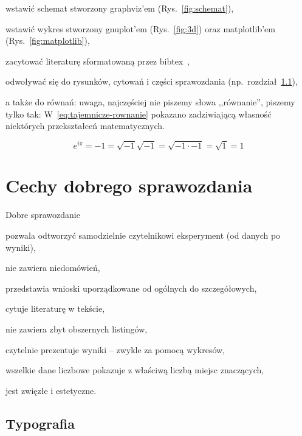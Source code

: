 \documentclass{article}
\begin{document}
\begin{tightlist}
\item wstawić schemat stworzony graphviz'em (Rys.~\ref{fig:schemat}),
\item wstawić wykres stworzony gnuplot'em (Rys.~\ref{fig:3d}) oraz matplotlib'em (Rys.~\ref{fig:matplotlib}),
\item zacytować literaturę sformatowaną przez bibtex~\cite{MiOIBskrypt,Goldberg-2002},
\item odwoływać się do rysunków, cytowań i części sprawozdania (np.\ rozdział~\ref{sec:typografia}),
\item a także do równań: uwaga, najczęściej nie piszemy słowa ,,równanie'', piszemy tylko tak: W~\eqref{eq:tajemnicze-rownanie} pokazano zadziwiającą własność niektórych przekształceń matematycznych.
\end{tightlist}


\begin{equation}
\label{eq:tajemnicze-rownanie}
e^{i \pi} = -1 = \sqrt {-1} \sqrt {-1} = \sqrt {-1 \cdot -1} = \sqrt 1 = 1
\end{equation}


\section{Cechy dobrego sprawozdania}

Dobre sprawozdanie
\begin{tightlist}
\item pozwala odtworzyć samodzielnie czytelnikowi eksperyment (od danych po wyniki),
\item nie zawiera niedomówień,
\item przedstawia wnioski uporządkowane od ogólnych do szczegółowych,
\item cytuje literaturę w tekście,
\item nie zawiera zbyt obszernych listingów,
\item czytelnie prezentuje wyniki -- zwykle za pomocą wykresów,
\item wszelkie dane liczbowe pokazuje z właściwą liczbą miejsc znaczących,
\item jest zwięzłe i estetyczne.
\end{tightlist}

\subsection{Typografia}
\label{sec:typografia}
\end{document}
